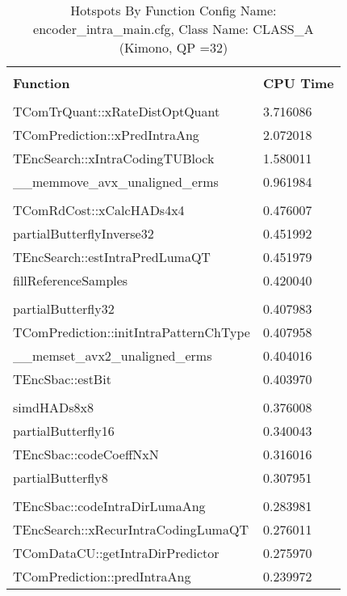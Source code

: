 \documentclass{article}%
\begin{document}
\begin{longtabu}{| X[l] | X[l] |}%
\caption{%
Hotspots By Function\newline%
 Config Name: encoder\_intra\_main.cfg,\newline%
 Class Name: CLASS\_A\newline%
 (Kimono, QP =32)%
}%
\hline%
&\\%
\textbf{Function}&\textbf{CPU Time}\\%
&\\%
\hline%
\endhead%
TComTrQuant::xRateDistOptQuant&3.716086\\%
\hline%
TComPrediction::xPredIntraAng&2.072018\\%
\hline%
TEncSearch::xIntraCodingTUBlock&1.580011\\%
\hline%
\_\_memmove\_avx\_unaligned\_erms&0.961984\\%
\hline%
&\\%
\hline%
TComRdCost::xCalcHADs4x4&0.476007\\%
\hline%
partialButterflyInverse32&0.451992\\%
\hline%
TEncSearch::estIntraPredLumaQT&0.451979\\%
\hline%
fillReferenceSamples&0.420040\\%
\hline%
&\\%
\hline%
partialButterfly32&0.407983\\%
\hline%
TComPrediction::initIntraPatternChType&0.407958\\%
\hline%
\_\_memset\_avx2\_unaligned\_erms&0.404016\\%
\hline%
TEncSbac::estBit&0.403970\\%
\hline%
&\\%
\hline%
simdHADs8x8&0.376008\\%
\hline%
partialButterfly16&0.340043\\%
\hline%
TEncSbac::codeCoeffNxN&0.316016\\%
\hline%
partialButterfly8&0.307951\\%
\hline%
&\\%
\hline%
TEncSbac::codeIntraDirLumaAng&0.283981\\%
\hline%
TEncSearch::xRecurIntraCodingLumaQT&0.276011\\%
\hline%
TComDataCU::getIntraDirPredictor&0.275970\\%
\hline%
TComPrediction::predIntraAng&0.239972\\%
\hline%
\end{longtabu}%
\newpage%
\end{document}
